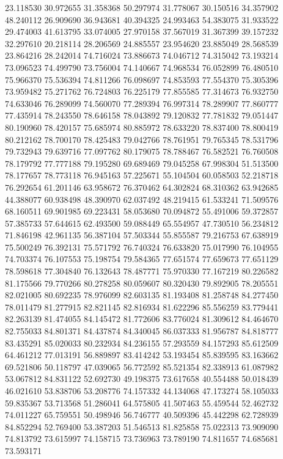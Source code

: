 23.118530
30.972655
31.358368
50.297974
31.778067
30.150516
34.357902
48.240112
26.909690
36.943681
40.394325
24.993463
54.383075
31.933522
29.474003
41.613795
33.074005
27.970158
37.567019
31.367399
39.157232
32.297610
20.218114
28.206569
24.885557
23.954620
23.885049
28.568539
23.864216
28.242014
74.716024
73.886673
74.046712
74.315042
73.193214
73.096523
74.499790
73.756004
74.140667
74.968534
76.052899
76.480510
75.966370
75.536394
74.811266
76.098697
74.853593
77.554370
75.305396
73.959482
75.271762
76.724803
76.225179
77.855585
77.314673
76.932750
74.633046
76.289099
74.560070
77.289394
76.997314
78.289907
77.860777
77.435914
78.243550
78.646158
78.043892
79.120832
77.781832
79.051447
80.190960
78.420157
75.685974
80.885972
78.633220
78.837400
78.800419
80.212162
78.700170
78.425483
79.042766
78.761951
79.765345
78.531796
79.732943
79.639716
77.097762
80.179075
78.788467
76.582521
76.760508
78.179792
77.777188
79.195280
69.689469
79.045258
67.998304
51.513500
78.177657
78.773118
76.945163
57.225671
55.104504
60.058503
52.218718
76.292654
61.201146
63.958672
76.370462
64.302824
68.310362
63.942685
44.388077
60.938498
48.390970
62.037492
48.219415
61.533241
71.509576
68.160511
69.901985
69.223431
58.053680
70.094872
55.491006
59.372857
57.385733
57.644615
62.493500
59.088449
65.554957
47.730510
56.234812
71.846198
42.961135
56.387104
57.503344
55.855587
79.216753
67.638919
75.500249
76.392131
75.571792
76.740324
76.633820
75.017990
76.104955
74.703374
76.107553
75.198754
79.584365
77.651574
77.659673
77.651129
78.598618
77.304840
76.132643
78.487771
75.970330
77.167219
80.226582
81.175566
79.770266
80.278258
80.059607
80.320430
79.892905
78.205551
82.021005
80.692235
78.976099
82.603135
81.193408
81.258748
84.277450
78.011479
81.277915
82.821145
82.816934
81.622296
85.556259
83.779441
82.263139
81.474055
84.145472
81.772606
83.776024
81.309612
84.464670
82.755033
84.801371
84.437874
84.340045
86.037333
81.956787
84.818777
83.435291
85.020033
80.232934
84.236155
57.293559
84.157293
85.612509
64.461212
77.013191
56.889897
83.414242
53.193454
85.839595
83.163662
69.521806
50.118797
47.039065
56.772592
85.521354
82.338913
61.087982
53.067812
84.831122
52.692730
49.198375
73.617658
40.554488
50.018439
46.021610
53.838706
53.208776
74.157332
44.134068
47.173274
58.105033
59.835367
53.713568
51.286041
64.575805
41.507463
55.459544
52.462732
74.011227
65.759551
50.498946
56.746777
40.509396
45.442298
62.728939
84.852294
52.769400
53.387203
51.546513
81.825858
75.022313
73.909090
74.813792
73.615997
74.158715
73.736963
73.789190
74.811657
74.685681
73.593171
